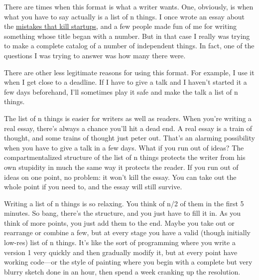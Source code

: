 There are times when this
                  format is what a writer wants. One, obviously, is when what
                  you have to say actually is a list of n things. I once wrote
                  an essay about the
                  \href{http://www.paulgraham.com/startupmistakes.html}{mistakes that kill startups}, and a few people made fun of me for writing something whose
                  title began with a number. But in that case I really was
                  trying to make a complete catalog of a number of independent
                  things. In fact, one of the questions I was trying to answer
                  was how many there were.

There are other less
                  legitimate reasons for using this format. For example, I use
                  it when I get close to a deadline. If I have to give a talk
                  and I haven't started it a few days beforehand, I'll sometimes
                  play it safe and make the talk a list of n things.

The
                  list of n things is easier for writers as well as readers.
                  When you're writing a real essay, there's always a chance
                  you'll hit a dead end. A real essay is a train of thought, and
                  some trains of thought just peter out. That's an alarming
                  possibility when you have to give a talk in a few days. What
                  if you run out of ideas? The compartmentalized structure of
                  the list of n things protects the writer from his own
                  stupidity in much the same way it protects the reader. If you
                  run out of ideas on one point, no problem: it won't kill the
                  essay. You can take out the whole point if you need to, and
                  the essay will still survive.

Writing a list of n
                  things is so relaxing. You think of n/2 of them in the first 5
                  minutes. So bang, there's the structure, and you just have to
                  fill it in. As you think of more points, you just add them to
                  the end. Maybe you take out or rearrange or combine a few, but
                  at every stage you have a valid (though initially low-res)
                  list of n things. It's like the sort of programming where you
                  write a version 1 very quickly and then gradually modify it,
                  but at every point have working code---or the style of
                  painting where you begin with a complete but very blurry
                  sketch done in an hour, then spend a week cranking up the
                  resolution.

